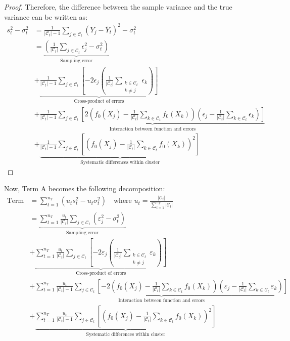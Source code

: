 \documentclass{mytemplate}
\begin{document}
\begin{proof}
Therefore, the difference between the sample variance and the true variance can be written as:
\begin{align*}
s_t^2 - \sigma_t^2 &= \frac{1}{|\mathcal{C}_t|-1} \sum_{j \in \mathcal{C}_t} (Y_j - \bar{Y}_t)^2 - \sigma_t^2 \\
&= \underbrace{\left(\frac{1}{|\mathcal{C}_t|} \sum_{j \in \mathcal{C}_t} \epsilon_j^2 - \sigma_t^2\right)}_{\text{Sampling error}} \\
&+ \underbrace{\frac{1}{|\mathcal{C}_t|-1} \sum_{j \in \mathcal{C}_t}\left[-2\epsilon_j\left(\frac{1}{|\mathcal{C}_t|} \sum_{\substack{k \in \mathcal{C}_t \\ k \neq j}} \epsilon_k\right)\right]}_{\text{Cross-product of errors}} \\
&+ \underbrace{\frac{1}{|\mathcal{C}_t|-1} \sum_{j \in \mathcal{C}_t}\left[2\left(f_0(X_j) - \frac{1}{|\mathcal{C}_t|} \sum_{k \in \mathcal{C}_t} f_0(X_k)\right)\left(\epsilon_j - \frac{1}{|\mathcal{C}_t|} \sum_{k \in \mathcal{C}_t} \epsilon_k\right)\right]}_{\text{Interaction between function and errors}} \\
&+ \underbrace{\frac{1}{|\mathcal{C}_t|-1} \sum_{j \in \mathcal{C}_t}\left[\left(f_0(X_j) - \frac{1}{|\mathcal{C}_t|} \sum_{k \in \mathcal{C}_t} f_0(X_k)\right)^2\right]}_{\text{Systematic differences within cluster}}
\end{align*}
\end{proof}

Now, Term A becomes the following decomposition:
\begin{align*}
\text{Term A} &= \sum_{t=1}^{n_T} (u_t s_t^2 - u_t \sigma_t^2) \quad \text{where } u_t = \frac{|\mathcal{C}_t|}{\sum_{t=1}^{n_T} |\mathcal{C}_t|} \\
&= \underbrace{\sum_{t=1}^{n_T} \frac{u_t}{|\mathcal{C}_t|} \sum_{j \in \mathcal{C}_t} (\varepsilon_j^2 - \sigma_t^2)}_{\text{Sampling error}} \\
&+ \underbrace{\sum_{t=1}^{n_T} \frac{u_t}{|\mathcal{C}_t|} \sum_{j \in \mathcal{C}_t} \left[-2\varepsilon_j \left(\frac{1}{|\mathcal{C}_t|} \sum_{\substack{k \in \mathcal{C}_t \\ k \neq j}} \varepsilon_k \right) \right]}_{\text{Cross-product of errors}} \\
&+ \underbrace{\sum_{t=1}^{n_T} \frac{u_t}{|\mathcal{C}_t| - 1} \sum_{j \in \mathcal{C}_t} \left[-2 \left(f_0(X_j) - \frac{1}{|\mathcal{C}_t|} \sum_{k \in \mathcal{C}_t} f_0(X_k) \right) \left(\varepsilon_j - \frac{1}{|\mathcal{C}_t|} \sum_{k \in \mathcal{C}_t} \varepsilon_k \right) \right]}_{\text{Interaction between function and errors}} \\
&+ \underbrace{\sum_{t=1}^{n_T} \frac{u_t}{|\mathcal{C}_t| - 1} \sum_{j \in \mathcal{C}_t} \left[ \left(f_0(X_j) - \frac{1}{|\mathcal{C}_t|} \sum_{k \in \mathcal{C}_t} f_0(X_k) \right)^2 \right]}_{\text{Systematic differences within cluster}}
\end{align*}
\end{document}
